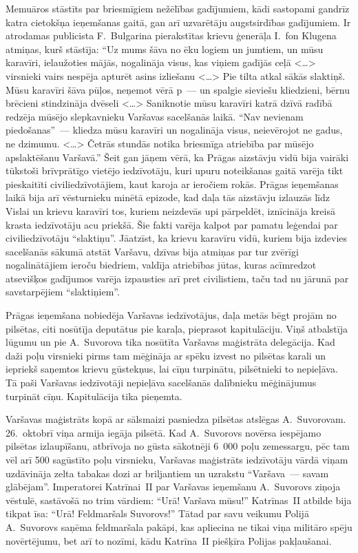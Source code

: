 \documentclass[twoside,a5paper,12pt,fleqn,openany]{extbook}
\newcommand{\citespace}{<\dots{}>}
\begin{document}
Memuāros stāstīts par briesmīgiem nežēlības gadījumiem, kādi sastopami gandrīz katra cietokšņa ieņemšanas gaitā, gan arī uzvarētāju augstsirdības gadījumiem. Ir atrodamas publicista F.~Bulgarina pierakstītas krievu ģenerāļa I.~fon Klugena atmiņas, kurš stāstīja: ``Uz mums šāva no ēku logiem un jumtiem, un mūsu karavīri, ielaužoties mājās, nogalināja visus, kas viņiem gadījās ceļā \citespace{} virsnieki vairs nespēja apturēt asins izliešanu \citespace{} Pie tilta atkal sākās slaktiņš. Mūsu karavīri šāva pūļos, neņemot vērā p~--- un spalgie sieviešu kliedzieni, bērnu brēcieni stindzināja dvēseli \citespace{} Saniknotie mūsu karavīri katrā dzīvā radībā redzēja mūsējo slepkavnieku Varšavas sacelšanās laikā. ``Nav nevienam piedošanas''~--- kliedza mūsu karavīri un nogalināja visus, neievērojot ne gadus, ne dzimumu. \citespace{} Četrās stundās notika briesmīga atriebība par mūsējo apslaktēšanu Varšavā.'' Šeit gan jāņem vērā, ka Prāgas aizstāvju vidū bija vairāki tūkstoši brīvprātīgo vietējo iedzīvotāju, kuri upuru noteikšanas gaitā varēja tikt pieskaitīti civiliedzīvotājiem, kaut karoja ar ieročiem rokās. Prāgas ieņemšanas laikā bija arī vēsturnieku minētā epizode, kad daļa tās aizstāvju izlauzās līdz Vislai un krievu karavīri tos, kuriem neizdevās upi pārpeldēt, iznīcināja kreisā krasta iedzīvotāju acu priekšā. Šie fakti varēja kalpot par pamatu leģendai par civiliedzīvotāju ``slaktiņu''. Jāatzīst, ka krievu karavīru vidū, kuriem bija izdevies sacelšanās sākumā atstāt Varšavu, dzīvas bija atmiņas par tur zvērīgi nogalinātājiem ieroču biedriem, valdīja atriebības jūtas, kuras acīmredzot atsevišķos gadījumos varēja izpausties arī pret civilistiem, taču tad nu jārunā par savstarpējiem ``slaktiņiem''.

Prāgas ieņemšana nobiedēja Varšavas iedzīvotājus, daļa metās bēgt projām no pilsētas, citi nosūtīja deputātus pie karaļa, pieprasot kapitulāciju. Viņš atbalstīja lūgumu un pie A.~Suvorova tika nosūtīta Varšavas maģistrāta delegācija. Kad daži poļu virsnieki pirms tam mēģināja ar spēku izvest no pilsētas karali un iepriekš saņemtos krievu gūstekņus, lai cīņu turpinātu, pilsētnieki to nepieļāva. Tā paši Varšavas iedzīvotāji nepieļāva sacelšanās dalībnieku mēģinājumus turpināt cīņu. Kapitulācija tika pieņemta.

Varšavas maģistrāts kopā ar sālsmaizi pasniedza pilsētas atslēgas A.~Suvorovam. 26.~oktobrī viņa armija iegāja pilsētā. Kad A.~Suvorovs novērsa iespējamo pilsētas izlaupīšanu, atbrīvoja no gūsta sākotnēji 6~000 poļu zemessargu, pēc tam vēl arī 500 sagūstīto poļu virsnieku, Varšavas maģistrāts iedzīvotāju vārdā viņam uzdāvināja zelta tabakas dozi ar briljantiem un uzrakstu ``Varšava~--- savam glābējam''. Imperatorei Katrīnai~II par Varšavas ieņemšanu A.~Suvorovs ziņoja vēstulē, sastāvošā no trim vārdiem: ``Urā! Varšava mūsu!'' Katrīnas~II atbilde bija tikpat īsa: ``Urā! Feldmaršals Suvorovs!'' Tātad par savu veikumu Polijā A.~Suvorovs saņēma feldmaršala pakāpi, kas apliecina ne tikai viņa militāro spēju novērtējumu, bet arī to nozīmi, kādu Katrīna~II piešķīra Polijas pakļaušanai.
\end{document}

